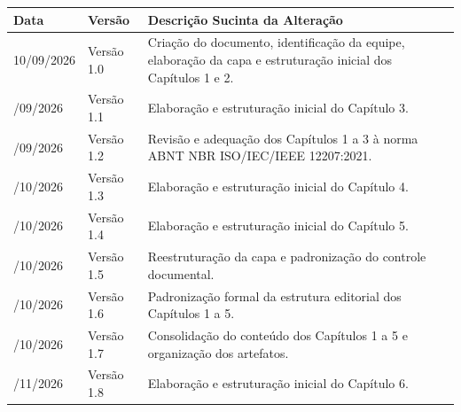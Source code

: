 



\noindent
\begin{minipage}{\textwidth}
{\fontsize{8.5pt}{12pt}\selectfont
\renewcommand{\arraystretch}{1.25}%
\begin{tabularx}{\linewidth}{@{}>{\fontExtraBold\color{BrandNavy}\centering\arraybackslash}m{2.4cm} >{\fontSemiBold\centering\arraybackslash}m{2.4cm} Y@{}}
  \toprule
  \textbf{Data} & \textbf{Versão} & \textbf{Descrição Sucinta da Alteração} \\
  \midrule
  10/09/2026 & Versão 1.0 & Criação do documento, identificação da equipe, elaboração da capa e estruturação inicial dos Capítulos 1 e 2. \\
  /09/2026 & Versão 1.1 & Elaboração e estruturação inicial do Capítulo 3. \\
  /09/2026 & Versão 1.2 & Revisão e adequação dos Capítulos 1 a 3 à norma ABNT NBR ISO/IEC/IEEE 12207:2021. \\
  /10/2026 & Versão 1.3 & Elaboração e estruturação inicial do Capítulo 4. \\
  /10/2026 & Versão 1.4 & Elaboração e estruturação inicial do Capítulo 5. \\
  /10/2026 & Versão 1.5 & Reestruturação da capa e padronização do controle documental. \\
  /10/2026 & Versão 1.6 & Padronização formal da estrutura editorial dos Capítulos 1 a 5. \\
  /10/2026 & Versão 1.7 & Consolidação do conteúdo dos Capítulos 1 a 5 e organização dos artefatos. \\
  /11/2026 & Versão 1.8 & Elaboração e estruturação inicial do Capítulo 6. \\

\end{tabularx}}
\end{minipage}
